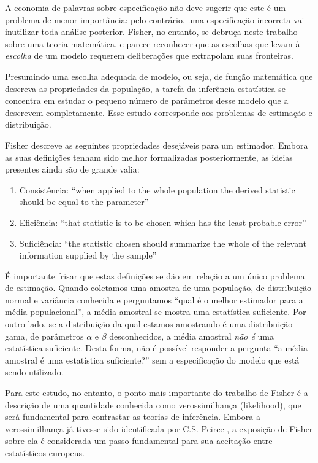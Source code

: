 A economia de palavras sobre especificação não deve sugerir que este é um problema de menor importância: pelo contrário,
uma especificação incorreta vai inutilizar toda análise posterior. Fisher, no entanto, se debruça neste trabalho sobre
uma teoria matemática, e parece reconhecer que as escolhas que levam à {\em escolha} de um modelo requerem deliberações
que extrapolam suas fronteiras.

Presumindo uma escolha adequada de modelo, ou seja,	de função matemática que descreva as propriedades da população,
a tarefa da inferência estatística se concentra em estudar o pequeno número de parâmetros desse modelo que a descrevem
completamente. Esse estudo corresponde aos problemas de estimação e distribuição.

Fisher descreve as seguintes propriedades desejáveis para um estimador. Embora as suas definições tenham sido
melhor formalizadas posteriormente, as ideias presentes ainda são de grande valia:
\begin{enumerate}
	\item Consistência: ``when applied to the whole population the derived statistic should be equal to the parameter''
	\item Eficiência: ``that statistic is to be chosen which has the least probable error''
	\item Suficiência: ``the statistic chosen should summarize the whole of the relevant information supplied by the sample''
\end{enumerate}

É importante frisar que estas definições se dão em relação a um único problema de estimação. Quando coletamos
uma amostra de uma população, de distribuição normal e variância conhecida e perguntamos ``qual é o melhor estimador para a média populacional'', 
a média amostral se mostra uma estatística suficiente. Por outro lado, se a distribuição da qual estamos amostrando
é uma distribuição gama, de parâmetros $\alpha$ e $\beta$ desconhecidos, a média amostral {\em não é} uma estatística
suficiente. Desta forma, não é possível responder a pergunta ``a média amostral é uma estatística suficiente?'' sem a especificação 
do modelo que está sendo utilizado.

Para este estudo, no entanto, o ponto mais importante do trabalho de Fisher é a descrição de uma 
quantidade conhecida como
verossimilhança (likelihood), que será fundamental para contrastar as teorias de inferência. Embora 
a verossimilhança já tivesse sido identificada por C.S.
Peirce \citep{Peirce1883}, a exposição de Fisher sobre ela é considerada um passo fundamental para sua aceitação entre 
estatísticos europeus. 

